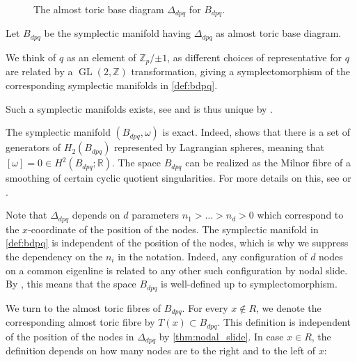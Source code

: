\documentclass[12pt,a4paper,abstract=true,final]{scrartcl}
\DeclareMathOperator{\GL}{GL}
\begin{document}
\begin{figure}
\centering
{}   
\caption{The almost toric base diagram $Δ_{dpq}$ for $B_{dpq}$.}
\label{fig:Bdpq_moment_image}
\end{figure}

\begin{definition}
    \label{def:bdpq}
    Let $B_{dpq}$ be the symplectic manifold having $\Delta_{dpq}$ as almost toric base diagram.
\end{definition}

We think of $q$ as an element of $ℤ_p/{±1}$, as different choices of representative for $q$ are related by a $\GL(2,ℤ)$ transformation, giving a symplectomorphism of the corresponding symplectic manifolds in \cref{def:bdpq}.

Such a symplectic manifolds exists, see \cite[Section 7.4]{evans2021atfs} and is thus unique by \cite[Theorem 8.5]{evans2021atfs}. 

\begin{remark}
    The symplectic manifold $(B_{dpq}, \omega)$ is exact.
    Indeed, \cite[Lemma 7.11]{evans2021atfs} shows that there is a set of generators of $H_2(B_{dpq})$ represented by Lagrangian spheres, meaning that $[\omega] = 0 \in H^2(B_{dpq};\mathbb{R})$.
The space $B_{dpq}$ can be realized as the Milnor fibre of a smoothing of certain cyclic quotient singularities.
For more details on this, see \cite[Section 7.4]{evans2021atfs} or \cite{Eva19}.
\end{remark}

Note that $\Delta_{dpq}$ depends on $d$ parameters $n_1>\ldots>n_d > 0$ which correspond to the $x$-coordinate of the position of the nodes.
The symplectic manifold in \cref{def:bdpq} is independent of the position of the nodes, which is why we suppress the dependency on the $n_i$ in the notation.
Indeed, any configuration of $d$ nodes on a common eigenline is related to any other such configuration by nodal slide.
By \cite[Theorem 8.10]{evans2021atfs}, this means that the space $B_{dpq}$ is well-defined up to symplectomorphism.

We turn to the almost toric fibres of $B_{dpq}$.
For every $x \notin R$, we denote the corresponding almost toric fibre by $T(x) \subset B_{dpq}$.
This definition is independent of the position of the nodes in $\Delta_{dpq}$ by \cref{thm:nodal_slide}.
In case $x \in R$, the definition depends on how many nodes are to the right and to the left of $x$:
\end{document}
